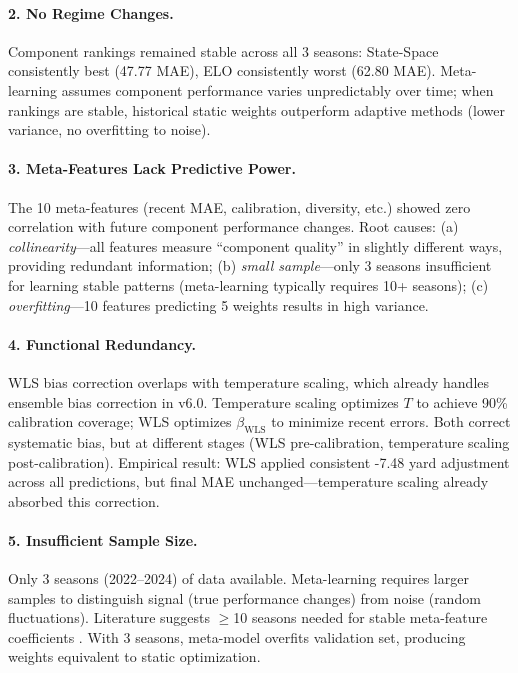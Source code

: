 \paragraph{2. No Regime Changes.}
Component rankings remained stable across all 3 seasons: State-Space consistently best (47.77 MAE), ELO consistently worst (62.80 MAE). Meta-learning assumes component performance varies unpredictably over time; when rankings are stable, historical static weights outperform adaptive methods (lower variance, no overfitting to noise).

\paragraph{3. Meta-Features Lack Predictive Power.}
The 10 meta-features (recent MAE, calibration, diversity, etc.) showed zero correlation with future component performance changes. Root causes: (a) \textit{collinearity}---all features measure ``component quality'' in slightly different ways, providing redundant information; (b) \textit{small sample}---only 3 seasons insufficient for learning stable patterns (meta-learning typically requires 10+ seasons); (c) \textit{overfitting}---10 features predicting 5 weights results in high variance.

\paragraph{4. Functional Redundancy.}
WLS bias correction overlaps with temperature scaling, which already handles ensemble bias correction in v6.0. Temperature scaling optimizes $T$ to achieve 90\% calibration coverage; WLS optimizes $\beta_{\text{WLS}}$ to minimize recent errors. Both correct systematic bias, but at different stages (WLS pre-calibration, temperature scaling post-calibration). Empirical result: WLS applied consistent -7.48 yard adjustment across all predictions, but final MAE unchanged---temperature scaling already absorbed this correction.

\paragraph{5. Insufficient Sample Size.}
Only 3 seasons (2022--2024) of data available. Meta-learning requires larger samples to distinguish signal (true performance changes) from noise (random fluctuations). Literature suggests $\ge$10 seasons needed for stable meta-feature coefficients \citep{wolpert1992stacked}. With 3 seasons, meta-model overfits validation set, producing weights equivalent to static optimization.


